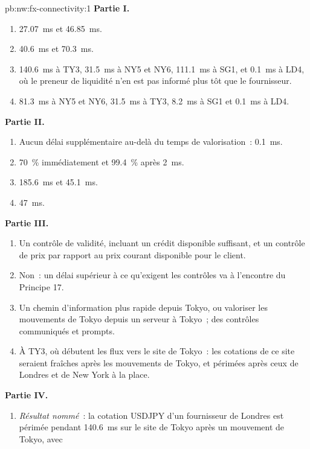 \begin{solution}{pb:nw:fx-connectivity:1}
\textbf{Partie I.}
\begin{enumerate}
\item \qty{27.07}{\milli\second} et \qty{46.85}{\milli\second}.
\item \qty{40.6}{\milli\second} et \qty{70.3}{\milli\second}.
\item \qty{140.6}{\milli\second} à TY3, \qty{31.5}{\milli\second} à NY5 et NY6, \qty{111.1}{\milli\second} à SG1, et
  \qty{0.1}{\milli\second} à LD4, où le preneur de liquidité n'en est pas informé plus tôt que le fournisseur.
\item \qty{81.3}{\milli\second} à NY5 et NY6, \qty{31.5}{\milli\second} à TY3, \qty{8.2}{\milli\second} à SG1 et
  \qty{0.1}{\milli\second} à LD4.
\end{enumerate}
\textbf{Partie II.}
\begin{enumerate}[resume]
\item Aucun délai supplémentaire au-delà du temps de valorisation~: \qty{0.1}{\milli\second}.
\item 70~\% immédiatement et 99.4~\% après \qty{2}{\milli\second}.
\item \qty{185.6}{\milli\second} et \qty{45.1}{\milli\second}.
\item \qty{47}{\milli\second}.
\end{enumerate}
\textbf{Partie III.}
\begin{enumerate}[resume]
\item Un contrôle de validité, incluant un crédit disponible suffisant, et un contrôle de prix par rapport au prix courant disponible pour le client.
\item Non~: un délai supérieur à ce qu'exigent les contrôles va à l'encontre du Principe 17.
\item Un chemin d'information plus rapide depuis Tokyo, ou valoriser les mouvements de Tokyo depuis un serveur à Tokyo~; des contrôles communiqués et prompts.
\item À TY3, où débutent les flux vers le site de Tokyo~: les cotations de ce site seraient fraîches après les mouvements de Tokyo, et périmées après ceux
  de Londres et de New York à la place.
\end{enumerate}
\textbf{Partie IV.}
\begin{enumerate}[resume]
\item \emph{Résultat nommé}~: la cotation USDJPY d'un fournisseur de Londres est périmée pendant \qty{140.6}{\milli\second} sur le site de Tokyo après un mouvement de Tokyo, avec

\end{enumerate}
\end{solution}
